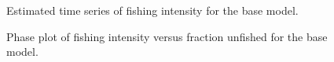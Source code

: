 \documentclass[
]{scrartcl}
\begin{document}
\pagebreak

\begin{figure}[H]


\caption{\label{fig-spr}Estimated time series of fishing intensity for
the base model.}

\end{figure}%

\begin{figure}[H]


\caption{\label{fig-spr-phase}Phase plot of fishing intensity versus
fraction unfished for the base model.}

\end{figure}%
\end{document}
